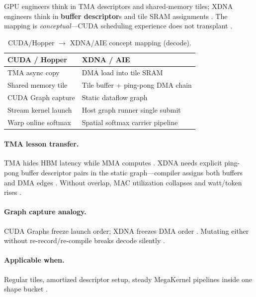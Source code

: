 GPU engineers think in TMA descriptors and shared-memory tiles; XDNA engineers think in \textbf{buffer descriptor}s and tile SRAM assignments \citep{nvidia2022hopper,semianalysis2024tma,amd2024xdna}.
The mapping is \emph{conceptual}---CUDA scheduling experience does not transplant \citep{patel2025llminference,yirage2026}.

\begin{table}[t]
\centering
\caption{CUDA/Hopper $\rightarrow$ XDNA/AIE concept mapping (decode).}
\label{tab:cuda_xdna_map}
\begin{tabular}{ll}
\toprule
\textbf{CUDA / Hopper} & \textbf{XDNA / AIE} \\
\midrule
TMA async copy & DMA load into tile SRAM \\
Shared memory tile & Tile buffer + ping-pong DMA chain \\
CUDA Graph capture & Static dataflow graph \\
Stream kernel launch & Host graph runner single submit \\
Warp online softmax & Spatial softmax carrier pipeline \\
\bottomrule
\end{tabular}
\end{table}

\paragraph{TMA lesson transfer.}
TMA hides HBM latency while MMA computes \citep{semianalysis2024tma,nvidia2022hopper}.
XDNA needs explicit ping-pong buffer descriptor pairs in the static graph---compiler assigns both buffers and DMA edges \citep{amd2024aie,yirage2026}.
Without overlap, MAC utilization collapses and watt/token rises \citep{patel2025llminference}.

\paragraph{Graph capture analogy.}
CUDA Graphs freeze launch order; XDNA freezes DMA order \citep{nvidia2024cudagraphs,amd2024xdna}.
Mutating either without re-record/re-compile breaks decode silently \citep{taxbreak2026,memoryfloor2026}.

\paragraph{Applicable when.}
Regular tiles, amortized descriptor setup, steady MegaKernel pipelines inside one shape bucket \citep{amd2024xdna,semianalysis2024tma}.

